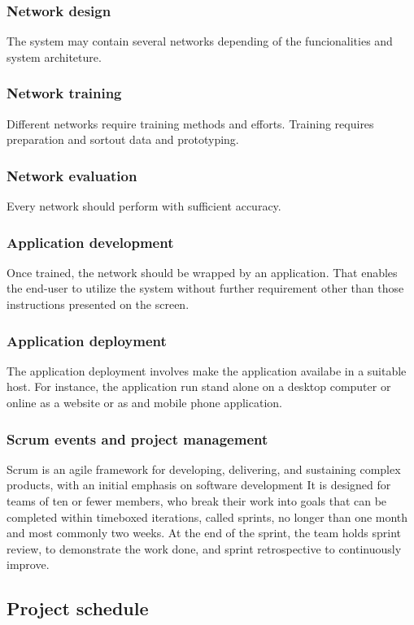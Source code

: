 \documentclass{article}
\begin{document}
\begin{enumerate}
\begin{enumerate}
\subsubsection{Network design}
\label{sec:org8fb7273}
The system may contain several networks depending of the funcionalities and system architeture.
\subsubsection{Network training}
\label{sec:orgd9af0d2}
Different networks require training methods and efforts.
Training requires preparation and sortout data and prototyping.
\subsubsection{Network evaluation}
\label{sec:orgba03fa4}
Every network should perform with sufficient accuracy.
\subsubsection{Application development}
\label{sec:orgd903476}
Once trained, the network should be wrapped by an application.
That enables the end-user to utilize the system without further requirement other than those instructions presented on the screen.
\subsubsection{Application deployment}
\label{sec:org1f26eb3}
The application deployment involves make the application availabe in a suitable host.
For instance, the application run stand alone on a desktop computer or online as a website or as and mobile phone application.
\subsubsection{Scrum events and project management}
\label{sec:org6227b01}
Scrum is an agile framework for developing, delivering, and sustaining complex products, with an initial emphasis on software development
It is designed for teams of ten or fewer members, who break their work into goals that can be completed within timeboxed iterations, called sprints, no longer than one month and most commonly two weeks.
At the end of the sprint, the team holds sprint review, to demonstrate the work done, and sprint retrospective to continuously improve.

\subsection{Project schedule}
\label{sec:org8df338a}


\end{enumerate}
\end{enumerate}
\end{document}

